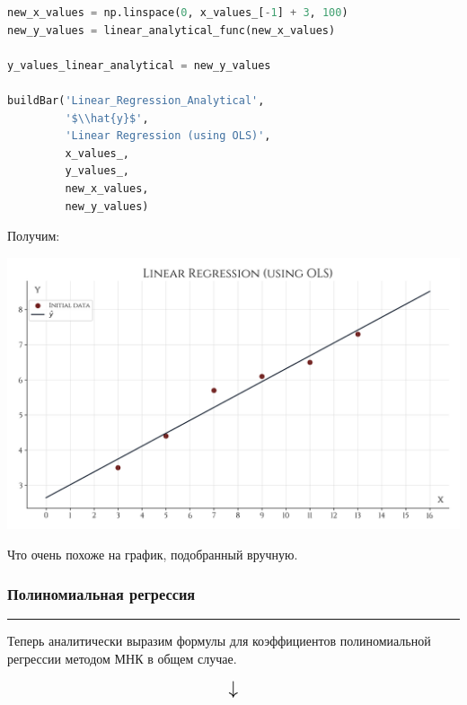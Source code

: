 \documentclass[a4paper, 14pt]{extarticle}
\begin{document}
\begin{center}
    \begin{lstlisting}[language=Python]
new_x_values = np.linspace(0, x_values_[-1] + 3, 100)
new_y_values = linear_analytical_func(new_x_values)

y_values_linear_analytical = new_y_values

buildBar('Linear_Regression_Analytical', 
         '$\\hat{y}$', 
         'Linear Regression (using OLS)', 
         x_values_, 
         y_values_, 
         new_x_values, 
         new_y_values)
    \end{lstlisting}
\end{center}

Получим:

\begin{center}
    \includegraphics[width=1\textwidth, height=1\textheight, keepaspectratio]{Linear_Regression_Analytical} \\
\end{center}

Что очень похоже на график, подобранный вручную.

\subsubsection*{{Полиномиальная регрессия}}\vspace{-20pt}\rule{\linewidth}{0.1mm}

Теперь аналитически выразим формулы для коэффициентов полиномиальной регрессии методом МНК в общем 
случае.

\vfill

\begin{equation*}
    \scalebox{1.5}{
        $\downarrow$
    }
\end{equation*}
\end{document}

